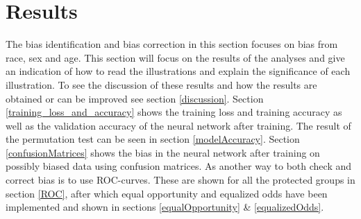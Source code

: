 \documentclass[11pt, fleqn, titlepage]{article}
\begin{document}

	
	\section{Results}\label{results}
	The bias identification and bias correction in this section focuses on bias from race, sex and age. This section will focus on the results of the analyses and give an indication of how to read the illustrations and explain the significance of each illustration. To see the discussion of these results and how the results are obtained or can be improved see section \ref{discussion}. Section \ref{training_loss_and_accuracy} shows the training loss and training accuracy as well as the validation accuracy of the neural network after training. The result of the permutation test can be seen in section \ref{modelAccuracy}. Section \ref{confusionMatrices} shows the bias in the neural network after training on possibly biased data using confusion matrices. As another way to both check and correct bias is to use ROC-curves. These are shown for all the protected groups in section \ref{ROC}, after which equal opportunity and equalized odds have been implemented and shown in sections \ref{equalOpportunity} \& \ref{equalizedOdds}.
	
\end{document}
